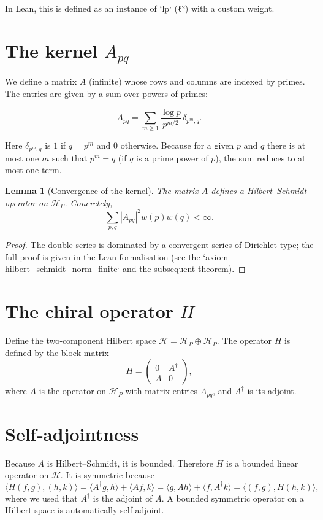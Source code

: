 \documentclass[11pt,a4paper]{article}
\newtheorem{lemma}[theorem]{Lemma}
\begin{document}
In Lean, this is defined as an instance of `lp` (ℓ²) with a custom weight.

\section{The kernel $A_{pq}$}

We define a matrix $A$ (infinite) whose rows and columns are indexed by primes. The entries are given by a sum over powers of primes:

\[
A_{pq} = \sum_{m\ge 1} \frac{\log p}{p^{m/2}} \, \delta_{p^m, q}.
\]

Here $\delta_{p^m, q}$ is $1$ if $q = p^m$ and $0$ otherwise. Because for a given $p$ and $q$ there is at most one $m$ such that $p^m = q$ (if $q$ is a prime power of $p$), the sum reduces to at most one term.

\begin{lemma}[Convergence of the kernel]
The matrix $A$ defines a Hilbert–Schmidt operator on $\mathcal{H}_P$. Concretely,
\[
\sum_{p,q} |A_{pq}|^2 w(p) w(q) < \infty.
\] 
\end{lemma}
\begin{proof}
The double series is dominated by a convergent series of Dirichlet type; the full proof is given in the Lean formalisation (see the `axiom hilbert_schmidt_norm_finite` and the subsequent theorem).
\end{proof}

\section{The chiral operator $H$}

Define the two‑component Hilbert space $\mathcal{H} = \mathcal{H}_P \oplus \mathcal{H}_P$. The operator $H$ is defined by the block matrix
\[
H = \begin{pmatrix} 0 & A^\dagger \\ A & 0 \end{pmatrix},
\]
where $A$ is the operator on $\mathcal{H}_P$ with matrix entries $A_{pq}$, and $A^\dagger$ is its adjoint.

\section{Self‑adjointness}

Because $A$ is Hilbert–Schmidt, it is bounded. Therefore $H$ is a bounded linear operator on $\mathcal{H}$. It is symmetric because
\[
\langle H (f,g), (h,k) \rangle = \langle A^\dagger g, h \rangle + \langle A f, k \rangle = \langle g, A h \rangle + \langle f, A^\dagger k \rangle = \langle (f,g), H (h,k) \rangle,
\]
where we used that $A^\dagger$ is the adjoint of $A$. A bounded symmetric operator on a Hilbert space is automatically self‑adjoint.
\end{document}
